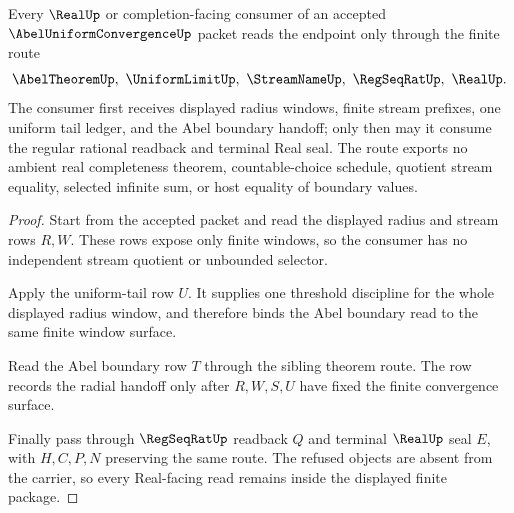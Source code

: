 \begin{theorem}
\label{thm:abel-uniform-convergence-real-seal-route}
Every $\RealUp$ or completion-facing consumer of an accepted $\AbelUniformConvergenceUp$ packet reads the endpoint only through the finite route
$$
\AbelTheoremUp,\ \UniformLimitUp,\ \StreamNameUp,\ \RegSeqRatUp,\ \RealUp .
$$
The consumer first receives displayed radius windows, finite stream prefixes, one uniform tail ledger, and the Abel boundary handoff; only then may it consume the regular rational readback and terminal Real seal. The route exports no ambient real completeness theorem, countable-choice schedule, quotient stream equality, selected infinite sum, or host equality of boundary values.
\end{theorem}
\begin{proof}
Start from the accepted packet and read the displayed radius and stream rows $R,W$. These rows expose only finite windows, so the consumer has no independent stream quotient or unbounded selector.

Apply the uniform-tail row $U$. It supplies one threshold discipline for the whole displayed radius window, and therefore binds the Abel boundary read to the same finite window surface.

Read the Abel boundary row $T$ through the sibling theorem route. The row records the radial handoff only after $R,W,S,U$ have fixed the finite convergence surface.

Finally pass through $\RegSeqRatUp$ readback $Q$ and terminal $\RealUp$ seal $E$, with $H,C,P,N$ preserving the same route. The refused objects are absent from the carrier, so every Real-facing read remains inside the displayed finite package.
\end{proof}




